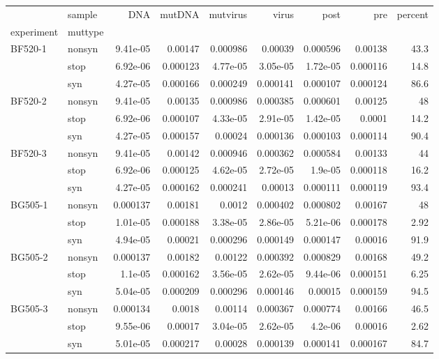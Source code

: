 {\small
\begin{tabular}{llrrrrrrr}
\toprule
        & sample &      DNA &   mutDNA &  mutvirus &    virus &     post &      pre &  percent \\
experiment & muttype &          &          &           &          &          &          &          \\
\midrule
BF520-1 & nonsyn & 9.41e-05 &  0.00147 &  0.000986 &  0.00039 & 0.000596 &  0.00138 &     43.3 \\
        & stop & 6.92e-06 & 0.000123 &  4.77e-05 & 3.05e-05 & 1.72e-05 & 0.000116 &     14.8 \\
        & syn & 4.27e-05 & 0.000166 &  0.000249 & 0.000141 & 0.000107 & 0.000124 &     86.6 \\
BF520-2 & nonsyn & 9.41e-05 &  0.00135 &  0.000986 & 0.000385 & 0.000601 &  0.00125 &       48 \\
        & stop & 6.92e-06 & 0.000107 &  4.33e-05 & 2.91e-05 & 1.42e-05 &   0.0001 &     14.2 \\
        & syn & 4.27e-05 & 0.000157 &   0.00024 & 0.000136 & 0.000103 & 0.000114 &     90.4 \\
BF520-3 & nonsyn & 9.41e-05 &  0.00142 &  0.000946 & 0.000362 & 0.000584 &  0.00133 &       44 \\
        & stop & 6.92e-06 & 0.000125 &  4.62e-05 & 2.72e-05 &  1.9e-05 & 0.000118 &     16.2 \\
        & syn & 4.27e-05 & 0.000162 &  0.000241 &  0.00013 & 0.000111 & 0.000119 &     93.4 \\
BG505-1 & nonsyn & 0.000137 &  0.00181 &    0.0012 & 0.000402 & 0.000802 &  0.00167 &       48 \\
        & stop & 1.01e-05 & 0.000188 &  3.38e-05 & 2.86e-05 & 5.21e-06 & 0.000178 &     2.92 \\
        & syn & 4.94e-05 &  0.00021 &  0.000296 & 0.000149 & 0.000147 &  0.00016 &     91.9 \\
BG505-2 & nonsyn & 0.000137 &  0.00182 &   0.00122 & 0.000392 & 0.000829 &  0.00168 &     49.2 \\
        & stop &  1.1e-05 & 0.000162 &  3.56e-05 & 2.62e-05 & 9.44e-06 & 0.000151 &     6.25 \\
        & syn & 5.04e-05 & 0.000209 &  0.000296 & 0.000146 &  0.00015 & 0.000159 &     94.5 \\
BG505-3 & nonsyn & 0.000134 &   0.0018 &   0.00114 & 0.000367 & 0.000774 &  0.00166 &     46.5 \\
        & stop & 9.55e-06 &  0.00017 &  3.04e-05 & 2.62e-05 &  4.2e-06 &  0.00016 &     2.62 \\
        & syn & 5.01e-05 & 0.000217 &   0.00028 & 0.000139 & 0.000141 & 0.000167 &     84.7 \\
\bottomrule
\end{tabular}

}